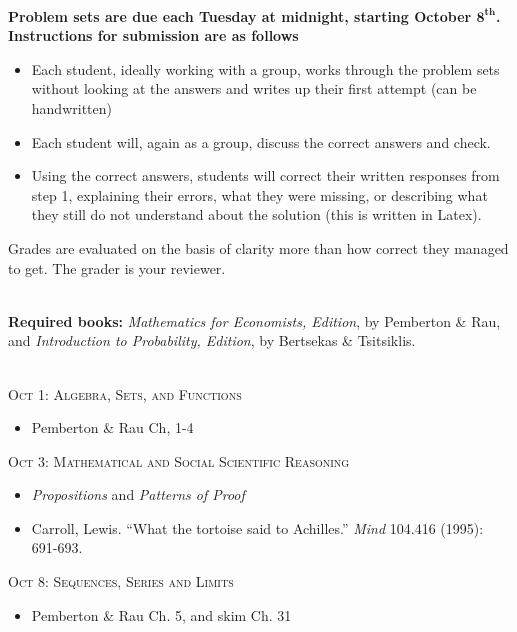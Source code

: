 \documentclass[11pt]{article}
\begin{document}
\ \\{\bf Problem sets are due each Tuesday at midnight, starting October $\mathbf{8^{\text{th}}}$.  Instructions for submission are as follows}

\begin{itemize}
\item Each student, ideally working with a group, works through the problem sets without looking at the answers and writes up their first attempt (can be handwritten)
\item Each student will, again as a group, discuss the correct answers and check.
\item Using the correct answers, students will correct their written responses from step 1, explaining their errors, what they were missing, or describing what they still do not understand about the solution (this is written in Latex).
\end{itemize}
Grades are evaluated on the basis of clarity more than how correct they managed to get.  The grader is your reviewer.


\ \\{\bf Required books:} \textit{ Mathematics for Economists,  Edition},  by Pemberton \& Rau, and \textit{Introduction to Probability,  Edition}, by Bertsekas \& Tsitsiklis.



\ \\ \noindent \textsc{Oct 1: Algebra, Sets, and Functions}

\begin{itemize}
\item Pemberton \& Rau Ch, 1-4

\end{itemize}




\noindent \textsc{Oct 3: Mathematical and Social Scientific Reasoning}

\begin{itemize}
\item \emph{Propositions} and \emph{Patterns of Proof}
\item Carroll, Lewis. ``What the tortoise said to Achilles.'' \emph{Mind} 104.416 (1995): 691-693.
\end{itemize}




\noindent \textsc{Oct 8: Sequences, Series and Limits}

\begin{itemize}
\item Pemberton \& Rau Ch. 5, and skim Ch. 31
\end{itemize}
\end{document}
